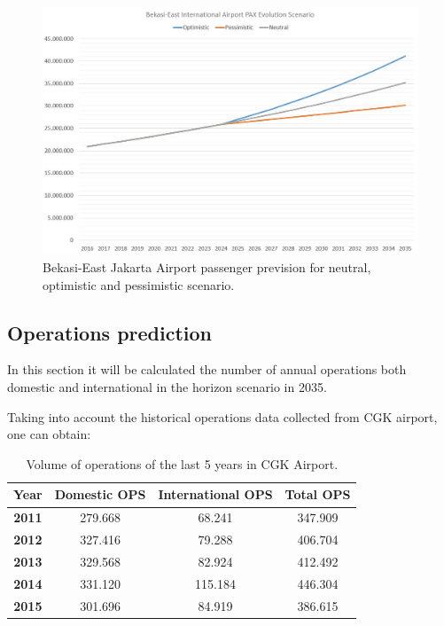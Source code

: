 \begin{figure}[H]
	\centering
	\includegraphics[clip, trim=0cm 0cm 0cm 0cm, width=1\textwidth]{./images/PROGNOSIS/TrafficForecast/BE_PAX_Prev_NEUOPTPES}
	\caption{Bekasi-East Jakarta Airport passenger prevision for neutral, optimistic and pessimistic scenario.}
	\label{BE_PAX_Prev_NEUOPTPES}
\end{figure}

	\subsection{Operations prediction}
In this section it will be calculated the number of annual operations both domestic and international in the horizon scenario in 2035.
	
Taking into account the historical operations data collected from CGK airport, one can obtain:

\begin{table}[ht!]
	\label{table:OPSCGK}
	\centering
\begin{tabular}{|c|c|c|c|}
	\hline 
	\textbf{Year} & \textbf{Domestic OPS} & \textbf{International OPS} & \textbf{Total OPS}\tabularnewline
	\hline  
	\textbf{2011} & 279.668  & 68.241  & 347.909 \tabularnewline
	\hline 
	\textbf{2012} & 327.416  & 79.288  & 406.704 \tabularnewline
	\hline 
	\textbf{2013} & 329.568  & 82.924  & 412.492 \tabularnewline
	\hline 
	\textbf{2014} & 331.120  & 115.184  & 446.304 \tabularnewline
	\hline 
	\textbf{2015} & 301.696  & 84.919  & 386.615 \tabularnewline
	\hline 
\end{tabular}
	\caption{Volume of operations of the last 5 years in CGK Airport.}
\end{table}
	

